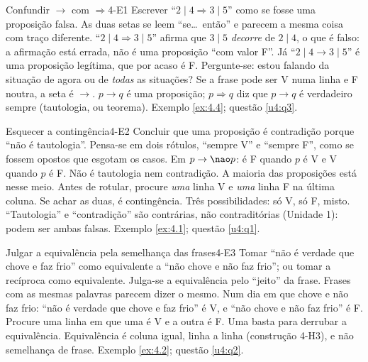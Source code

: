 \ErrosComuns

\begin{erro}{Confundir $\rightarrow$ com $\Rightarrow$}{4-E1}
 Escrever \enquote{$2\mid4\Rightarrow3\mid5$} como se fosse uma proposição falsa.
 As duas setas se leem \enquote{se\ldots\ então} e parecem a mesma coisa com traço diferente.
 \enquote{$2\mid4\Rightarrow3\mid5$} afirma que $3\mid5$ \emph{decorre} de $2\mid4$, o que é falso: a afirmação está errada, não é uma proposição \enquote{com valor F}. Já \enquote{$2\mid4\rightarrow3\mid5$} é uma proposição legítima, que por acaso é F.
 Pergunte-se: estou falando da situação de agora ou de \emph{todas} as situações? Se a frase pode ser V numa linha e F noutra, a seta é $\rightarrow$.
 $p\rightarrow q$ é uma proposição; $p\Rightarrow q$ diz que $p\rightarrow q$ é verdadeiro sempre (tautologia, ou teorema).
 Exemplo \ref{ex:4.4}; questão \ref{u4:q3}.
\end{erro}

\begin{erro}{Esquecer a contingência}{4-E2}
 Concluir que uma proposição é contradição porque \enquote{não é tautologia}.
 Pensa-se em dois rótulos, \enquote{sempre V} e \enquote{sempre F}, como se fossem opostos que esgotam os casos.
 Em $p\rightarrow{\nao}p$: é F quando $p$ é V e V quando $p$ é F. Não é tautologia nem contradição. A maioria das proposições está nesse meio.
 Antes de rotular, procure \emph{uma} linha V e \emph{uma} linha F na última coluna. Se achar as duas, é contingência.
 Três possibilidades: só V, só F, misto. \enquote{Tautologia} e \enquote{contradição} são contrárias, não contraditórias (Unidade 1): podem ser ambas falsas.
 Exemplo \ref{ex:4.1}; questão \ref{u4:q1}.
\end{erro}

\begin{erro}{Julgar a equivalência pela semelhança das frases}{4-E3}
 Tomar \enquote{não é verdade que chove e faz frio} como equivalente a \enquote{não chove e não faz frio}; ou tomar a recíproca como equivalente.
 Julga-se a equivalência pelo \enquote{jeito} da frase. Frases com as mesmas palavras parecem dizer o mesmo.
 Num dia em que chove e não faz frio: \enquote{não é verdade que chove e faz frio} é V, e \enquote{não chove e não faz frio} é F.
 Procure uma linha em que uma é V e a outra é F. Uma basta para derrubar a equivalência.
 Equivalência é coluna igual, linha a linha (construção 4-H3), e não semelhança de frase.
 Exemplo \ref{ex:4.2}; questão \ref{u4:q2}.
\end{erro}

